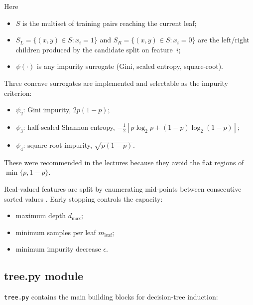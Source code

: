 \documentclass[12pt]{report}
\begin{document}
Here  

\begin{itemize}
  \item \(S\) is the multiset of training pairs reaching the current leaf;
  \item \(S_L=\{(x,y)\!\in\!S : x_i=1\}\) and
        \(S_R=\{(x,y)\!\in\!S : x_i=0\}\) are the left/right children
        produced by the candidate split on feature~\(i\);
  \item \(\psi(\cdot)\) is any impurity surrogate
        (Gini, scaled entropy, square-root).
\end{itemize}

Three concave surrogates are implemented and selectable as the impurity criterion:
\begin{itemize}
  \item $\psi_2$: Gini impurity, $2p(1-p)$;
  \item $\psi_3$: half-scaled Shannon entropy, $-\tfrac{1}{2}[p \log_2 p + (1-p)\log_2(1-p)]$;
  \item $\psi_4$: square-root impurity, $\sqrt{p(1-p)}$.
\end{itemize}

These were recommended in the lectures because they avoid the flat regions of
$\min\{p,1-p\}$.

Real-valued features are split by enumerating mid-points between consecutive sorted
values \citep[p.\,255]{shalev}.  Early stopping controls the capacity:

\begin{itemize}
  \item maximum depth $d_{\max}$;
  \item minimum samples per leaf $m_{\text{leaf}}$;
  \item minimum impurity decrease $\epsilon$.
\end{itemize}

\subsection{tree.py module}
\texttt{tree.py} contains the main building blocks for decision-tree induction:
\end{document}
